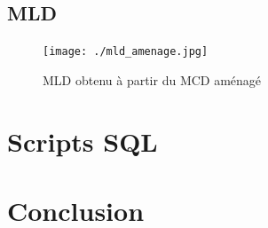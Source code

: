 \documentclass[12pt,french,titlepage]{article}
\begin{document}
	  \subsection{MLD}
	  
	  \begin{figure}[H]
	      \centering
	      \texttt{[image: ./mld\_amenage.jpg]}
	      \caption{MLD obtenu à partir du MCD aménagé}
	      
	   
	      
	  \end{figure}
	  
	  \section{Scripts SQL}
	  
	  
	  
	  \section{Conclusion}
    

	
	
	
\end{document}
